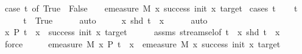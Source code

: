 \begin{isabellebody}
{\isacharequal}{\kern0pt}\ {\isacharparenleft}{\kern0pt}case\ t\ of\ True\ {\isasymRightarrow}\ {}{\isacharbar}{\kern0pt}False\ {\isasymRightarrow}\ {}{\isacharparenright}{\kern0pt}\ {\isacharasterisk}{\kern0pt}\ emeasure\ M\ {\isacharbraceleft}{\kern0pt}x{\isachardot}{\kern0pt}\ success\ {\isacharparenleft}{\kern0pt}init{\isacharplus}{\kern0pt}{}{\isacharparenright}{\kern0pt}\ x\ target{\isacharbraceright}{\kern0pt}{\isachardoublequoteclose}\isanewline
%
\isadelimproof
%
\endisadelimproof
%
\isatagproof
{}\isamarkupfalse%
\ {\isacharparenleft}{\kern0pt}cases\ t{\isacharparenright}{\kern0pt}\isanewline
\ \ \isamarkupfalse%
\ {\isachardoublequoteopen}t{\isachardoublequoteclose}\isanewline
\ \ \isamarkupfalse%
\ \isamarkupfalse%
\ {\isachardoublequoteopen}t\ {\isacharequal}{\kern0pt}\ True{\isachardoublequoteclose}\isanewline
\ \ \ \ \isamarkupfalse%
\ auto\isanewline
\ \ \isamarkupfalse%
\ \isamarkupfalse%
\ {\isachardoublequoteopen}{\isasymforall}x{\isachardot}{\kern0pt}\ shd\ {\isacharparenleft}{\kern0pt}t\ {\isacharhash}{\kern0pt}{\isacharhash}{\kern0pt}\ x{\isacharparenright}{\kern0pt}{\isachardoublequoteclose}\isanewline
\ \ \ \ \isamarkupfalse%
\ auto\isanewline
\ \ \isamarkupfalse%
\ \isamarkupfalse%
\ {\isachardoublequoteopen}{\isasymforall}x{\isachardot}{\kern0pt}\ P\ {\isacharparenleft}{\kern0pt}t\ {\isacharhash}{\kern0pt}{\isacharhash}{\kern0pt}\ x{\isacharparenright}{\kern0pt}\ {\isasymlongleftrightarrow}\ success\ {\isacharparenleft}{\kern0pt}init{\isacharplus}{\kern0pt}{}{\isacharparenright}{\kern0pt}\ x\ target{\isachardoublequoteclose}\isanewline
\ \ \ \ \isamarkupfalse%
\ assms{\isacharparenleft}{\kern0pt}{}{\isacharparenright}{\kern0pt}\ stream{\isachardot}{\kern0pt}sel{\isacharparenleft}{\kern0pt}{}{\isacharparenright}{\kern0pt}{\isacharbrackleft}{\kern0pt}of\ t\ {\isacharunderscore}{\kern0pt}{\isacharbrackright}{\kern0pt}\ {\isacartoucheopen}{\isasymforall}x{\isachardot}{\kern0pt}\ shd\ {\isacharparenleft}{\kern0pt}t\ {\isacharhash}{\kern0pt}{\isacharhash}{\kern0pt}\ x{\isacharparenright}{\kern0pt}{\isacartoucheclose}\isanewline
\ \ \ \ \isamarkupfalse%
\ force\isanewline
\ \ \isamarkupfalse%
\ \isamarkupfalse%
\ {\isachardoublequoteopen}emeasure\ M\ {\isacharbraceleft}{\kern0pt}x{\isachardot}{\kern0pt}\ P\ {\isacharparenleft}{\kern0pt}t\ {\isacharhash}{\kern0pt}{\isacharhash}{\kern0pt}\ x{\isacharparenright}{\kern0pt}{\isacharbraceright}{\kern0pt}\ {\isacharequal}{\kern0pt}\ emeasure\ M\ {\isacharbraceleft}{\kern0pt}x{\isachardot}{\kern0pt}\ success\ {\isacharparenleft}{\kern0pt}init{\isacharplus}{\kern0pt}{}{\isacharparenright}{\kern0pt}\ x\ target{\isacharbraceright}{\kern0pt}{\isachardoublequoteclose}\isanewline

\end{isabellebody}

